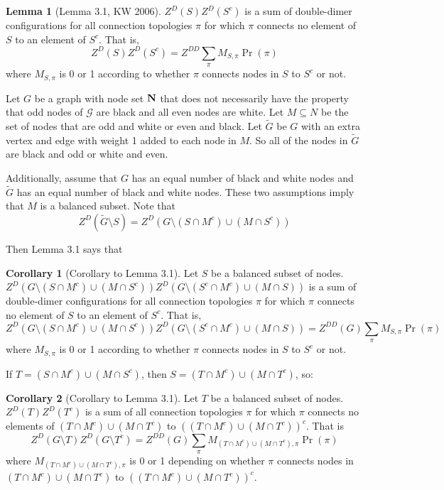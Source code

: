 \documentclass[11pt]{amsart}
\theoremstyle{definition}
\newtheorem*{cor*}{Corollary}
\newtheorem*{lemma*}{Lemma}
\begin{document}
\begin{lemma*} [Lemma 3.1, KW 2006]
$Z^{D}(S) Z^{D}(S^{c})$ is a sum of double-dimer configurations for all connection topologies $\pi$ for which $\pi$ connects no element of $S$ to an element of $S^{c}$. That is,
$$Z^{D}(S) Z^{D}(S^{c}) = Z^{DD} \sum\limits_{\pi} M_{S, \pi} \Pr (\pi)$$
where $M_{S, \pi}$ is 0 or 1 according to whether $\pi$ connects nodes in $S$ to $S^{c}$ or not.
\end{lemma*}

Let $G$ be a graph with node set ${\bf N}$ that does not necessarily have the property that odd nodes of $\mathcal{G}$ are black and all even nodes are white. Let $M \subseteq N$ be the set of nodes that are odd and white or even and black.
Let $\tilde{G}$ be $G$ with an extra vertex and edge with weight 1 added to each node in $M$. So all of the nodes in $\tilde{G}$ are black and odd or white and even.

Additionally, assume that $G$ has an equal number of black and white nodes and $\tilde{G}$ has an equal number of black and white nodes. These two assumptions imply that $M$ is a balanced subset. Note that
$$Z^{D}(\tilde{G} \setminus S) = Z^{D}(G \setminus (S \cap M^{c} ) \cup (M \cap S^{c}) )$$

Then Lemma 3.1 says that

\begin{cor*}[Corollary to Lemma 3.1]
Let $S$ be a balanced subset of nodes. \\
$Z^{D}(G \setminus (S \cap M^{c} ) \cup (M \cap S^{c})) Z^{D}(G \setminus (S^{c} \cap M^{c} ) \cup (M \cap S))$ is a sum of double-dimer configurations for all connection topologies $\pi$ for which $\pi$ connects no element of $S$ to an element of $S^{c}$. That is,
$$Z^{D}(G \setminus (S \cap M^{c} ) \cup (M \cap S^{c})) Z^{D}(G \setminus (S^{c} \cap M^{c} ) \cup (M \cap S)) = Z^{DD}(G) \sum\limits_{\pi} M_{S, \pi} \Pr (\pi)$$
where $M_{S, \pi}$ is 0 or 1 according to whether $\pi$ connects nodes in $S$ to $S^{c}$ or not.
\end{cor*}

If $T = (S \cap M^{c}) \cup (M \cap S^{c})$, then $S = (T \cap M^{c}) \cup (M \cap T^{c})$, so:

\begin{cor*}[Corollary to Lemma 3.1]
Let $T$ be a balanced subset of nodes.
$Z^{D}(T) Z^{D}(T^{c})$ is a sum of all connection topologies $\pi$ for which $\pi$ connects no elements of $(T \cap M^{c}) \cup (M \cap T^{c})$ to $\left((T \cap M^{c}) \cup (M \cap T^{c})\right)^{c}$. That is
$$Z^{D}(G \setminus T) Z^{D}(G \setminus T^{c}) = Z^{DD}(G) \sum\limits_{\pi} M_{(T \cap M^{c}) \cup (M \cap T^{c}), \pi} \Pr (\pi)$$
where $M_{(T \cap M^{c}) \cup (M \cap T^{c}), \pi}$ is 0 or 1 depending on whether $\pi$ connects nodes in $(T \cap M^{c}) \cup (M \cap T^{c})$ to $\left((T \cap M^{c}) \cup (M \cap T^{c})\right)^{c}$.
\end{cor*}
\end{document}
